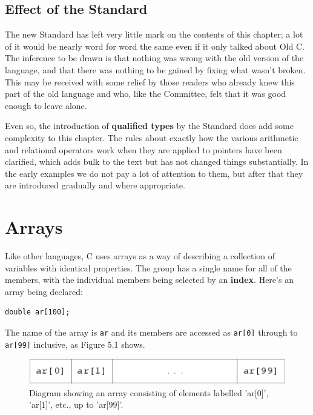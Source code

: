   

  \subsection{Effect of the Standard}
   

   The new Standard has left very little mark on the contents of this
    chapter; a lot of it would be nearly word for word the same even if it
    only talked about Old C. The inference to be drawn is that nothing was
    wrong with the old version of the language, and that there was nothing
    to be gained by fixing what wasn't broken. This may be received with
    some relief by those readers who already knew this part of the old
    language and who, like the Committee, felt that it was good enough to
    leave alone.


   Even so, the introduction of \textbf{qualified types} by the
    Standard does add some complexity to this chapter. The rules about
    exactly how the various arithmetic and relational operators work when
    they are applied to pointers have been clarified, which adds bulk to the
    text but has not changed things substantially. In the early examples we
    do not pay a lot of attention to them, but after that they are
    introduced gradually and where appropriate.


  

 
        \section{Arrays}
        

  

  Like other languages, C uses arrays as a way of describing a collection
   of variables with identical properties. The group has a single name for
   all of the members, with the individual members being selected by an
   \textbf{index}. Here's an array being declared:


  \begin{Verbatim}
double ar[100];
\end{Verbatim}

  The name of the array is \texttt{ar} and its members are accessed
   as \texttt{ar[0]} through to \texttt{ar[99]} inclusive, as
   Figure 5.1 shows.


  \begin{figure}\centering\includegraphics[type=pdf,read=.pdf,ext=.pdf,scale=1.0]{figure/5.1}\caption{Diagram showing an array consisting of elements labelled 'ar[0]',           'ar[1]', etc., up to 'ar[99]'.}\end{figure}

